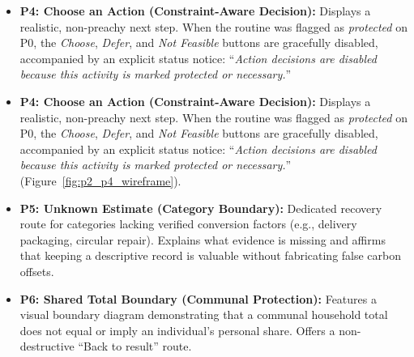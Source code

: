 \documentclass[12pt,a4paper]{article}
\begin{document}
\begin{itemize}[leftmargin=*]
  \item \textbf{P4: Choose an Action (Constraint-Aware Decision):} Displays a realistic, non-preachy next step. When the routine was flagged as \emph{protected} on P0, the \emph{Choose}, \emph{Defer}, and \emph{Not Feasible} buttons are gracefully disabled, accompanied by an explicit status notice: ``\emph{Action decisions are disabled because this activity is marked protected or necessary.}''
  \item \textbf{P4: Choose an Action (Constraint-Aware Decision):} Displays a realistic, non-preachy next step. When the routine was flagged as \emph{protected} on P0, the \emph{Choose}, \emph{Defer}, and \emph{Not Feasible} buttons are gracefully disabled, accompanied by an explicit status notice: ``\emph{Action decisions are disabled because this activity is marked protected or necessary.}'' (Figure~\ref{fig:p2_p4_wireframe}).
  
  \item \textbf{P5: Unknown Estimate (Category Boundary):} Dedicated recovery route for categories lacking verified conversion factors (e.g., delivery packaging, circular repair). Explains what evidence is missing and affirms that keeping a descriptive record is valuable without fabricating false carbon offsets.
  
  \item \textbf{P6: Shared Total Boundary (Communal Protection):} Features a visual boundary diagram demonstrating that a communal household total does not equal or imply an individual's personal share. Offers a non-destructive ``Back to result'' route.
\end{itemize}
\end{document}
